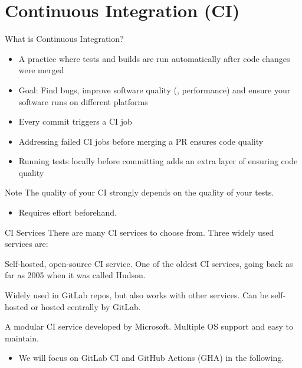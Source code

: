 \section{Continuous Integration (CI)}

\begin{frame}[fragile]{What is Continuous Integration?}
  \begin{itemize}
    \setlength{\itemsep}{1em}
    \item A practice where tests and builds are run automatically after code changes were
      merged
    \item Goal: Find bugs, improve software quality (\eg, performance) and ensure
      your software runs on different platforms
    \item Every commit triggers a CI job
    \item Addressing failed CI jobs before merging a PR ensures code quality
    \item Running tests locally before committing adds an extra layer of ensuring code quality
  \end{itemize}
  \begin{block}{Note}
     The quality of your CI strongly depends on the quality of your tests.
     \begin{itemize}
      \item Requires effort beforehand.
     \end{itemize}
  \end{block}
\end{frame}

\begin{frame}[fragile]{CI Services}
  There are many CI services to choose from. Three widely used services are:
  \begin{description}
    \setlength{\itemsep}{1em}
    \item[Jenkins] Self-hosted, open-source CI service. One of the oldest CI services,
      going back as far as 2005 when it was called Hudson.
    \item[GitLab CI] Widely used in GitLab repos, but also works with
      other services. Can be self-hosted or hosted centrally by GitLab.
    \item[GitHub Actions] A modular CI service developed by Microsoft. Multiple OS
      support and easy to maintain.
  \end{description}
  \begin{itemize}
    \item We will focus on GitLab CI and GitHub Actions (GHA) in the following.
  \end{itemize}
\end{frame}


